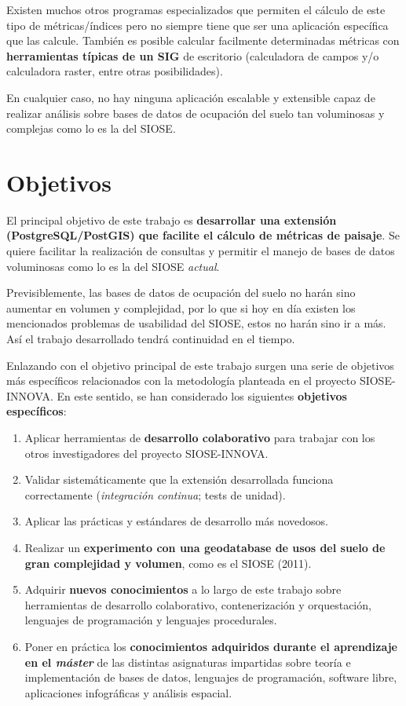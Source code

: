 Existen muchos otros programas especializados que permiten el cálculo de este tipo de métricas/índices pero no siempre tiene que ser una aplicación específica que las calcule. También es posible calcular facilmente determinadas métricas con \textbf{herramientas típicas de un SIG} de escritorio (calculadora de campos y/o calculadora raster, entre otras posibilidades).

En cualquier caso, no hay ninguna aplicación escalable y extensible capaz de realizar análisis sobre bases de datos de ocupación del suelo tan voluminosas y complejas como lo es la del SIOSE.


\section{Objetivos}\label{sec:objetivos}

El principal objetivo de este trabajo es \textbf{desarrollar una extensión (PostgreSQL/PostGIS) que facilite el cálculo de métricas de paisaje}. Se quiere facilitar la realización de consultas y permitir el manejo de bases de datos voluminosas como lo es la del SIOSE \textit{actual}. 

Previsiblemente, las bases de datos de ocupación del suelo no harán sino aumentar en volumen y complejidad, por lo que si hoy en día existen los mencionados problemas de usabilidad del SIOSE, estos no harán sino ir a más. Así el trabajo desarrollado tendrá continuidad en el tiempo.

Enlazando con el objetivo principal de este trabajo surgen una serie de objetivos más específicos relacionados con la metodología planteada en el proyecto SIOSE-INNOVA. En este sentido, se han considerado los siguientes \textbf{objetivos específicos}:
\begin{enumerate}
\item Aplicar herramientas de \textbf{desarrollo colaborativo} para trabajar con los otros investigadores del proyecto SIOSE-INNOVA.
\item Validar sistemáticamente que la extensión desarrollada funciona correctamente (\textit{integración continua}; tests de unidad).
\item Aplicar las prácticas y estándares de desarrollo más novedosos.
\item Realizar un \textbf{experimento con una geodatabase de usos del suelo de gran complejidad y volumen}, como es el SIOSE (2011).
\item Adquirir \textbf{nuevos conocimientos} a lo largo de este trabajo sobre herramientas de desarrollo colaborativo, contenerización y orquestación, lenguajes de programación y lenguajes procedurales.
\item Poner en práctica los \textbf{conocimientos adquiridos durante el aprendizaje en el \textit{máster}} de las distintas asignaturas impartidas sobre teoría e implementación de bases de datos, lenguajes de programación, software libre, aplicaciones infográficas y análisis espacial.
\end{enumerate}





